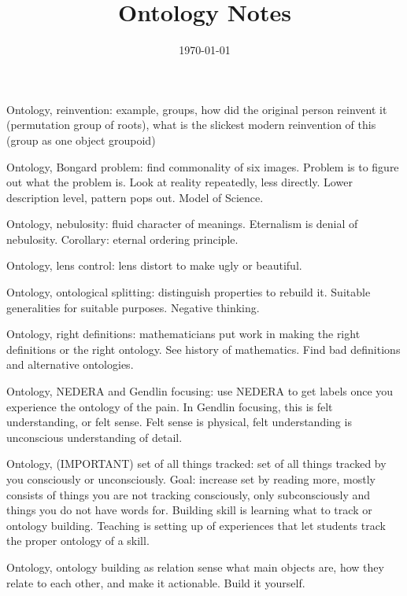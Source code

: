 \documentclass[10pt,twocolumn]{article}
\title{\textbf{Ontology Notes}}
\date{\today}
\begin{document}

Ontology, reinvention: example, groups, how did the original person reinvent it (permutation group of roots), what is the slickest modern reinvention of this (group as one object groupoid)

Ontology, Bongard problem: find commonality of six images. Problem is to figure out what the problem is. Look at reality repeatedly, less directly. Lower description level, pattern pops out. Model of Science.

Ontology, nebulosity: fluid character of meanings. Eternalism is denial of nebulosity. Corollary: eternal ordering principle.

Ontology, lens control: lens distort to make ugly or beautiful.

Ontology, ontological splitting: distinguish properties to rebuild it. Suitable generalities for suitable purposes. Negative thinking.

Ontology, right definitions: mathematicians put work in making the right definitions or the right ontology. See history of mathematics. Find bad definitions and alternative ontologies.

Ontology, NEDERA and Gendlin focusing: use NEDERA to get labels once you experience the ontology of the pain. In Gendlin focusing, this is felt understanding, or felt sense. Felt sense is physical, felt understanding is unconscious understanding of detail.

Ontology, (IMPORTANT) set of all things tracked: set of all things tracked by you consciously or unconsciously. Goal: increase set by reading more, mostly consists of things you are not tracking consciously, only subconsciously and things you do not have words for. Building skill is learning what to track or ontology building. Teaching is setting up of experiences that let students track the proper ontology of a skill.

Ontology, ontology building as relation sense what main objects are, how they relate to each other, and make it actionable. Build it yourself.
\end{document}

